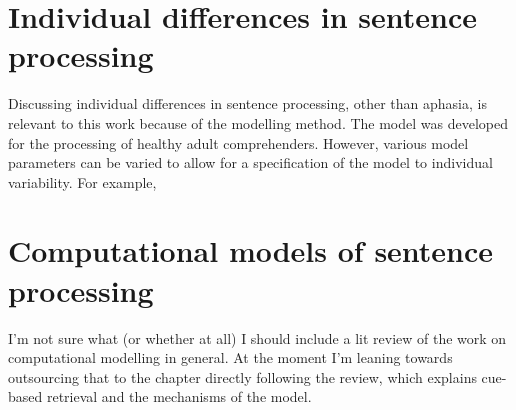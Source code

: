 \documentclass[main_thesis]{subfiles}
\begin{document}
\section{Individual differences in sentence processing}

Discussing individual differences in sentence processing, other than aphasia, is relevant to this work because of the modelling method. The  model was developed for the processing of healthy adult comprehenders. However, various model parameters can be varied to allow for a specification of the model to individual variability. For example, 

\section{Computational models of sentence processing}

I'm not sure what (or whether at all) I should include a lit review of the work on computational modelling in general. At the moment I'm leaning towards outsourcing that to the chapter directly following the review, which explains cue-based retrieval and the mechanisms of the  model.



\end{document}
